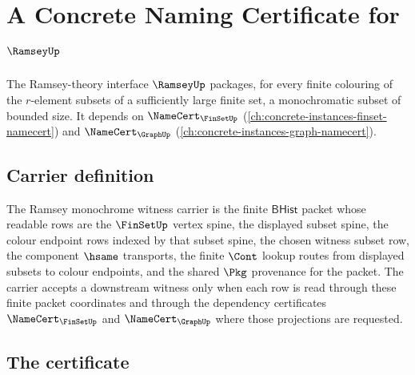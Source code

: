 \chapter{A Concrete Naming Certificate for $\RamseyUp$}
\label{ch:concrete-instances-ramsey-namecert}

The Ramsey-theory interface $\RamseyUp$ packages, for every finite colouring of the $r$-element subsets of a sufficiently large finite set, a monochromatic subset of bounded size. It depends on $\NameCert_{\FinSetUp}$ (\autoref{ch:concrete-instances-finset-namecert}) and $\NameCert_{\GraphUp}$ (\autoref{ch:concrete-instances-graph-namecert}).

\section{Carrier definition}
\label{sec:ramsey-carrier}

\begin{definition}
\label{def:ramsey-monochrome-witness-carrier}
The Ramsey monochrome witness carrier is the finite $\mathsf{BHist}$ packet
whose readable rows are the $\FinSetUp$ vertex spine, the displayed subset
spine, the colour endpoint rows indexed by that subset spine, the chosen
witness subset row, the component $\hsame$ transports, the finite $\Cont$
lookup routes from displayed subsets to colour endpoints, and the shared
$\Pkg$ provenance for the packet. The carrier accepts a downstream witness
only when each row is read through these finite packet coordinates and through
the dependency certificates $\NameCert_{\FinSetUp}$ and
$\NameCert_{\GraphUp}$ where those projections are requested.
\end{definition}

\section{The certificate}
\label{sec:ramsey-certificate}

